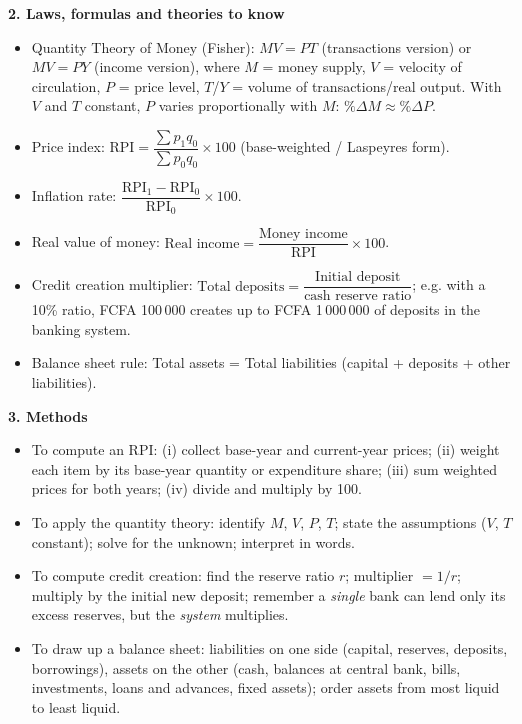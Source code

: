 \documentclass[11pt]{article}
\newcommand{\cle}[1]{{\popxbold\color{popdark}#1}}
\begin{document}
\begin{bilan}
\textbf{2. Laws, formulas and theories to know}\par
\begin{itemize}
\item \cle{Quantity Theory of Money} (Fisher): $MV = PT$ (transactions version) or $MV = PY$ (income version), where $M$ = money supply, $V$ = velocity of circulation, $P$ = price level, $T$/$Y$ = volume of transactions/real output. With $V$ and $T$ constant, $P$ varies proportionally with $M$: $\%\Delta M \approx \%\Delta P$.
\item \cle{Price index}: $\mathrm{RPI} = \dfrac{\sum p_1 q_0}{\sum p_0 q_0}\times 100$ (base-weighted / Laspeyres form).
\item \cle{Inflation rate}: $\dfrac{\mathrm{RPI}_1 - \mathrm{RPI}_0}{\mathrm{RPI}_0}\times 100$.
\item \cle{Real value of money}: $\text{Real income} = \dfrac{\text{Money income}}{\mathrm{RPI}}\times 100$.
\item \cle{Credit creation multiplier}: $\text{Total deposits} = \dfrac{\text{Initial deposit}}{\text{cash reserve ratio}}$; e.g. with a 10\% ratio, FCFA 100\,000 creates up to FCFA 1\,000\,000 of deposits in the banking system.
\item \cle{Balance sheet rule}: Total assets = Total liabilities (capital + deposits + other liabilities).
\end{itemize}

\textbf{3. Methods}\par
\begin{itemize}
\item To compute an RPI: (i) collect base-year and current-year prices; (ii) weight each item by its base-year quantity or expenditure share; (iii) sum weighted prices for both years; (iv) divide and multiply by 100.
\item To apply the quantity theory: identify $M$, $V$, $P$, $T$; state the assumptions ($V$, $T$ constant); solve for the unknown; interpret in words.
\item To compute credit creation: find the reserve ratio $r$; multiplier $= 1/r$; multiply by the initial new deposit; remember a \emph{single} bank can lend only its excess reserves, but the \emph{system} multiplies.
\item To draw up a balance sheet: liabilities on one side (capital, reserves, deposits, borrowings), assets on the other (cash, balances at central bank, bills, investments, loans and advances, fixed assets); order assets from most liquid to least liquid.
\end{itemize}


\end{bilan}
\end{document}

